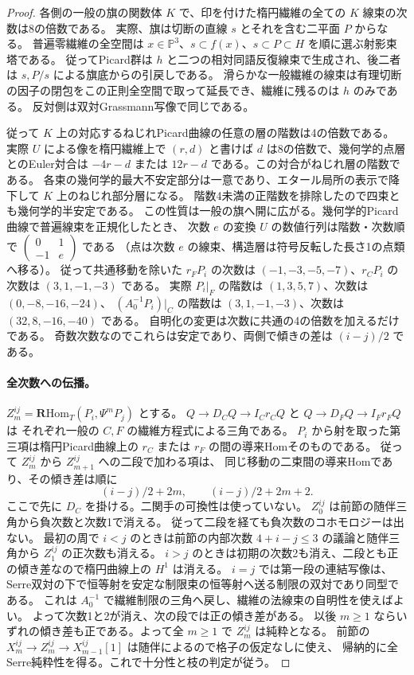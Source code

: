 \begin{proof}
各側の一般の旗の関数体 $K$ で、印を付けた楕円繊維の全ての $K$ 線束の次数は8の倍数である。
実際、旗は切断の直線 $s$ とそれを含む二平面 $P$ からなる。
普遍零繊維の全空間は $x\in\mathbb P^3$、$s\subset f(x)$、$s\subset P\subset H$ を順に選ぶ射影束塔である。
従ってPicard群は $h$ と二つの相対同語反復線束で生成され、後二者は $s,P/s$ による旗底からの引戻しである。
滑らかな一般繊維の線束は有理切断の因子の閉包をこの正則全空間で取って延長でき、繊維に残るのは $h$ のみである。
反対側は双対Grassmann写像で同じである。

従って $K$ 上の対応するねじれPicard曲線の任意の層の階数は4の倍数である。
実際 $U$ による像を楕円繊維上で $(r,d)$ と書けば $d$ は8の倍数で、幾何学的点層とのEuler対合は
$-4r-d$ または $12r-d$ である。この対合がねじれ層の階数である。
各束の幾何学的最大不安定部分は一意であり、エタール局所の表示で降下して $K$ 上のねじれ部分層になる。
階数4未満の正階数を排除したので四束とも幾何学的半安定である。
この性質は一般の旗へ開に広がる。幾何学的Picard曲線で普遍線束を正規化したとき、
次数 $e$ の変換 $U$ の数値行列は階数・次数順で
$\left(\begin{smallmatrix}0&1\\-1&e\end{smallmatrix}\right)$ である
（点は次数 $e$ の線束、構造層は符号反転した長さ1の点類へ移る）。
従って共通移動を除いた $r_F P_i$ の次数は $(-1,-3,-5,-7)$、$r_C P_i$ の次数は $(3,1,-1,-3)$ である。
実際 $P_i|_F$ の階数は $(1,3,5,7)$、次数は $(0,-8,-16,-24)$、
$(A_0^{-1}P_i)|_C$ の階数は $(3,1,-1,-3)$、次数は $(32,8,-16,-40)$ である。
自明化の変更は次数に共通の4の倍数を加えるだけである。
奇数次数なのでこれらは安定であり、両側で傾きの差は $(i-j)/2$ である。

\paragraph{全次数への伝播。}
$Z_m^{ij}=\mathbf R\mathrm{Hom}_T(P_i,\Psi^mP_j)$ とする。
$Q\to D_C Q\to I_C r_C Q$ と $Q\to D_F Q\to I_F r_F Q$ は
それぞれ一般の $C,F$ の繊維方程式による三角である。
$P_i$ から射を取った第三項は楕円Picard曲線上の $r_C$ または $r_F$ の間の導来Homそのものである。
従って $Z_m^{ij}$ から $Z_{m+1}^{ij}$ への二段で加わる項は、
同じ移動の二束間の導来Homであり、その傾き差は順に
\[
 (i-j)/2+2m,\qquad (i-j)/2+2m+2.
\]
ここで先に $D_C$ を掛ける。二関手の可換性は使っていない。
$Z_0^{ij}$ は前節の随伴三角から負次数と次数1で消える。
従って二段を経ても負次数のコホモロジーは出ない。
最初の周で $i<j$ のときは前節の内部次数 $4+i-j\le3$ の議論と随伴三角から $Z_1^{ij}$ の正次数も消える。
$i>j$ のときは初期の次数2も消え、二段とも正の傾き差なので楕円曲線上の $H^1$ は消える。
$i=j$ では第一段の連結写像は、Serre双対の下で恒等射を安定な制限束の恒等射へ送る制限の双対であり同型である。
これは $A_0^{-1}$ で繊維制限の三角へ戻し、繊維の法線束の自明性を使えばよい。
よって次数1と2が消え、次の段では正の傾き差がある。
以後 $m\ge1$ ならいずれの傾き差も正である。よって全 $m\ge1$ で $Z_m^{ij}$ は純粋となる。
前節の $X_m^{ij}\to Z_m^{ij}\to X_{m-1}^{ij}[1]$ は随伴によるので格子の仮定なしに使え、
帰納的に全Serre純粋性を得る。これで十分性と枝の判定が従う。
\end{proof}
